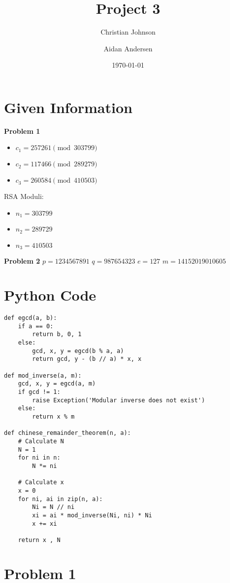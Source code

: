 \documentclass[11pt]{article}
\author{Christian Johnson \and Aidan Andersen}
\date{\today}
\title{Project 3}
\begin{document}
\maketitle
\tableofcontents

\newpage

\section{Given Information}
\label{sec:orgc9cca5b}
\textbf{Problem 1}
\begin{itemize}
\item \(c_1=257261 \pmod{303799}\)
\item \(c_2 = 117466\pmod{289279}\)
\item \(c_3=260584\pmod{410503}\)
\end{itemize}

RSA Moduli:
\begin{itemize}
\item \(n_1=303799\)
\item \(n_2=289729\)
\item \(n_3=410503\)
\end{itemize}

\textbf{Problem 2}
\(p=1234567891\)
\(q=987654323\)
\(e=127\)
\(m=14152019010605\)

\section{Python Code}
\label{sec:org5adb492}

\begin{verbatim}
def egcd(a, b):
    if a == 0:
        return b, 0, 1
    else:
        gcd, x, y = egcd(b % a, a)
        return gcd, y - (b // a) * x, x

def mod_inverse(a, m):
    gcd, x, y = egcd(a, m)
    if gcd != 1:
        raise Exception('Modular inverse does not exist')
    else:
        return x % m

def chinese_remainder_theorem(n, a):
    # Calculate N
    N = 1
    for ni in n:
        N *= ni

    # Calculate x
    x = 0
    for ni, ai in zip(n, a):
        Ni = N // ni
        xi = ai * mod_inverse(Ni, ni) * Ni
        x += xi

    return x , N

\end{verbatim}

\section{Problem 1}
\label{sec:orgf0fe553}
\end{document}
